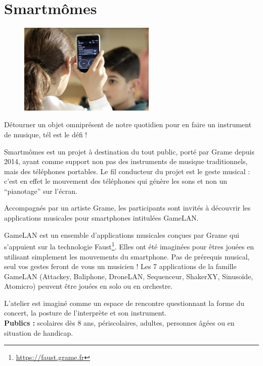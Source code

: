 \documentclass[fontsize=12pt]{scrartcl} %
\numberwithin{equation}{section} %
\numberwithin{table}{section} %
\begin{document}
\pagebreak

\appendix

\section{Smartmômes}
\label{app:smartmomes}

\begin{figure}
\centering
\includegraphics[width=6.5cm]{img/smartmomes}
\label{fig:sm}
\end{figure}

Détourner un objet omniprésent de notre quotidien pour en faire un instrument de musique, tél est le défi !

Smartmômes est un projet à destination du tout public, porté par Grame depuis 2014, ayant comme support non pas des instruments de musique traditionnels, mais des téléphones portables. Le fil conducteur du projet est le geste musical : c'est en effet le mouvement des téléphones qui génère les sons et non un ``pianotage'' sur l'écran.

Accompagnés par un artiste Grame, les participants sont invités à découvrir les applications musicales pour smartphones intitulées GameLAN.
 
GameLAN est un ensemble d'applications musicales conçues par Grame qui s'appuient sur la technologie Faust\footnote{\url{https://faust.grame.fr}}. Elles ont été imaginées pour êtres jouées en utilisant simplement les mouvements du smartphone. Pas de prérequis musical, seul vos gestes feront de vous un musicien ! Les 7 applications de la famille GameLAN (Attackey, Baliphone, DroneLAN, Sequenceur, ShakerXY, Sinusoïde, Atomicro) peuvent être jouées en solo ou en orchestre.
 
L'atelier est imaginé comme un espace de rencontre questionnant la forme du concert, la posture de l'interprète et son instrument.\\

\noindent
\textbf{Publics :} scolaires dès 8 ans, périscolaires, adultes, personnes âgées ou en situation de handicap. 
\end{document}
